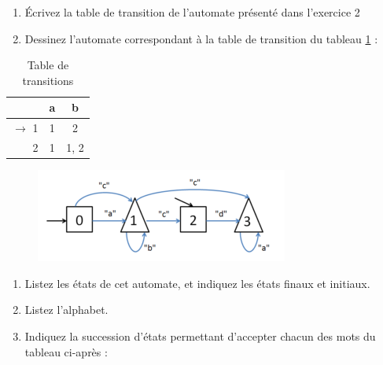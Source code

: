 \begin{enumerate}
  \item  Écrivez la table de transition de l'automate présenté dans l'exercice 2
  \item  Dessinez l'automate correspondant à la table de transition du tableau \ref{exer5c} :
\end{enumerate}

\begin{center}
\begin{table}[h]
\begin{tabular}{|r|c|c|}
\hline
~		&a	&b	\\
\hline
$\rightarrow$ 1	&1	&2	\\
\hline
2		&1	&1, 2	\\
\hline
\end{tabular}
\caption{Table de transitions \label{exer5c}}
\end{table}
\end{center}

\exer


\vspace{-0.5cm}
\begin{figure}[h]
\includegraphics[width=.6\textwidth]{images/TD1_7b.png}
\end{figure}
\begin{enumerate}
  \item  Listez les états de cet automate,
et indiquez les états finaux et
initiaux.
  \item  Listez l'alphabet.
  \item  Indiquez la succession d’états permettant d’accepter chacun des mots du tableau ci-après :

\end{enumerate}


